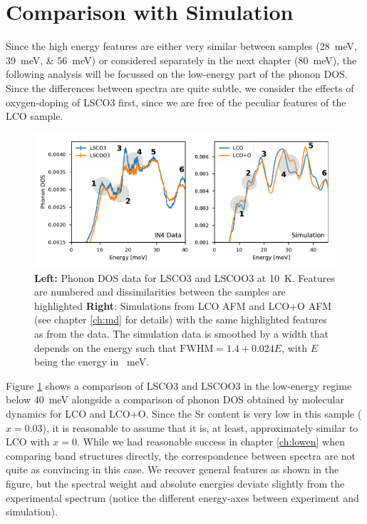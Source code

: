 \section{Comparison with Simulation}
Since the high energy features are either very similar between samples (\SIlist{28;39;56}{\milli\eV}) or considered separately in the next chapter (\SI{80}{\milli\eV}), the following analysis will be focussed on the low-energy part of the phonon DOS. Since the differences between spectra are quite subtle, we consider the effects of oxygen-doping of LSCO3 first, since we are free of the peculiar features of the LCO sample.

\begin{figure}
    \centering
    \includegraphics[width=\textwidth]{fig/gdos/simulation_in4_compare.pdf}
    \caption[compare gdos simulation]{\textbf{Left:} Phonon DOS data for LSCO3 and LSCOO3 at \SI{10}{\kelvin}. Features are numbered and dissimilarities between the samples are highlighted \textbf{Right}: Simulations from LCO AFM and LCO+O AFM (see chapter \ref{ch:md} for details) with the same highlighted features as from the data. The simulation data is smoothed by a width that depends on the energy such that $\text{FWHM} = 1.4 + 0.024E$, with $E$ being the energy in \SI{}{\milli\eV}.}
    \label{fig:compare_gdos_sim}
\end{figure}

Figure \ref{fig:compare_gdos_sim} shows a comparison of LSCO3 and LSCOO3 in the low-energy regime below \SI{40}{\milli\eV} alongside a comparison of phonon DOS obtained by molecular dynamics for LCO and LCO+O. Since the Sr content is very low in this sample ($x=0.03$), it is reasonable to assume that it is, at least, approximately similar to LCO with $x=0$. While we had reasonable success in chapter \ref{ch:lowen} when comparing band structures directly, the correspondence between spectra are not quite as convincing in this case. We recover general features as shown in the figure, but the spectral weight and absolute energies deviate slightly from the experimental spectrum (notice the different energy-axes between experiment and simulation).

